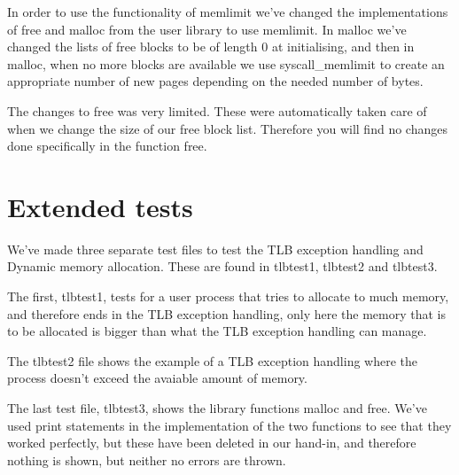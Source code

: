 \documentclass[12pt,a4paper,danish]{article}
\begin{document}
In order to use the functionality of memlimit we've changed the implementations of free and malloc from the user library to use memlimit. In malloc we've changed the lists of free blocks to be of length 0 at initialising, and then in malloc, when no more blocks are available we use syscall\_memlimit to create an appropriate number of new pages depending on the needed number of bytes.

The changes to free was very limited. These were automatically taken care of when we change the size of our free block list. Therefore you will find no changes done specifically in the function free.
 
\section{Extended tests}
We've made three separate test files to test the TLB exception handling and Dynamic memory allocation. These are found in tlbtest1, tlbtest2 and tlbtest3.

The first, tlbtest1, tests for a user process that tries to allocate to much memory, and therefore ends in the TLB exception handling, only here the memory that is to be allocated is bigger than what the TLB exception handling can manage.

The tlbtest2 file shows the example of a TLB exception handling where the process doesn't exceed the avaiable amount of memory.

The last test file, tlbtest3, shows the library functions malloc and free. We've used print statements in the implementation of the two functions to see that they worked perfectly, but these have been deleted in our hand-in, and therefore nothing is shown, but neither no errors are thrown.
\end{document}
